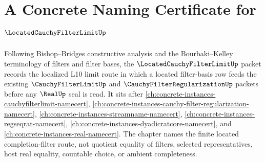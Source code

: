 \chapter{A Concrete Naming Certificate for $\LocatedCauchyFilterLimitUp$}
\label{ch:concrete-instances-located-cauchy-filter-limit-namecert}

Following Bishop--Bridges constructive analysis and the Bourbaki--Kelley terminology of filters and filter bases, the $\LocatedCauchyFilterLimitUp$ packet records the localized L10 limit route in which a located filter-basis row feeds the existing $\CauchyFilterLimitUp$ and $\CauchyFilterRegularizationUp$ packets before any $\RealUp$ seal is read. It sits after \autoref{ch:concrete-instances-cauchyfilterlimit-namecert}, \autoref{ch:concrete-instances-cauchy-filter-regularization-namecert}, \autoref{ch:concrete-instances-streamname-namecert}, \autoref{ch:concrete-instances-regseqrat-namecert}, \autoref{ch:concrete-instances-dyadicratcore-namecert}, and \autoref{ch:concrete-instances-real-namecert}. The chapter names the finite located completion-filter route, not quotient equality of filters, selected representatives, host real equality, countable choice, or ambient completeness.

